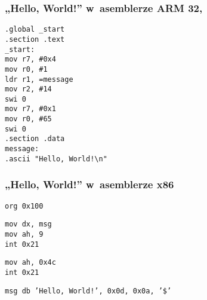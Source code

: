 \documentclass[10pt,t]{beamer}
\begin{document}
\begin{frame}
  \frametitle{„Hello, World!” w~asemblerze ARM 32,
    \parencite{Low-Level-Learning-You-Can-Learn-ARM-ETC-Ver-2020}}


  \texttt{.global \_start} \\
  \texttt{.section .text} \\



  \texttt{\_start:} \\[-0.2em]
  \hphantom{aaaaaaaa} \texttt{mov r7, \#0x4} \\
  \hphantom{aaaaaaaa} \texttt{mov r0, \#1} \\
  \hphantom{aaaaaaaa} \texttt{ldr r1, =message} \\
  \hphantom{aaaaaaaa} \texttt{mov r2, \#14} \\

  \hphantom{aaaaaaaa} \texttt{swi 0} \\

  \hphantom{aaaaaaaa} \texttt{mov r7, \#0x1} \\
  \hphantom{aaaaaaaa} \texttt{mov r0, \#65} \\

  \hphantom{aaaaaaaa} \texttt{swi 0} \\



  \texttt{.section .data} \\
  \texttt{message:} \\
  \hphantom{aaaaaaaa} \texttt{.ascii "Hello, World!\textbackslash n"}

\end{frame}




\begin{frame}
  \frametitle{„Hello, World!” w~asemblerze x86
    \parencite{Anonymous-Hello-World-in-x86-Assembly-Language}}


  \texttt{org 0x100} \\
  \vspace{0.8em}

  \texttt{mov dx, msg} \\
  \texttt{mov ah, 9} \\
  \texttt{int 0x21} \\
  \vspace{0.8em}

  \texttt{mov ah, 0x4c} \\
  \texttt{int 0x21} \\
  \vspace{0.8em}

  \texttt{msg db 'Hello, World!', 0x0d, 0x0a, '\$'}

\end{frame}
\end{document}
